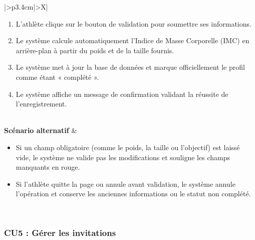 ﻿\documentclass[a4paper,12pt]{report}
\begin{document}
\begin{table}[H]
\begin{tabularx}{\textwidth}{|>{\RaggedRight\arraybackslash}p{3.4cm}|>{\RaggedRight\arraybackslash}X|}
\begin{minipage}[t]{\linewidth}
\begin{enumerate}[label=\arabic*., leftmargin=*, topsep=0pt, itemsep=1pt]
    \begin{itemize}[leftmargin=*, topsep=1pt, itemsep=1pt]
        \item \textbf{Première configuration} : le système affiche un questionnaire vide. L'athlète remplit ses informations obligatoires (âge, taille, poids, objectif principal, etc.). 
        \item \textbf{Mise à jour} : le système affiche le formulaire pré-rempli avec les anciennes données. L'athlète modifie uniquement les informations souhaitées. 
    \end{itemize}
    \item L'athlète clique sur le bouton de validation pour soumettre ses informations.
    \item Le système calcule automatiquement l'Indice de Masse Corporelle (IMC) en arrière-plan à partir du poids et de la taille fournis.
    \item Le système met à jour la base de données et marque officiellement le profil comme étant « complété ».
    \item Le système affiche un message de confirmation validant la réussite de l'enregistrement.
\end{enumerate}
\vspace{2pt}
\end{minipage} \\
\hline
\textbf{Scénario alternatif} &
\begin{minipage}[t]{\linewidth}
\vspace{2pt}
\begin{itemize}[leftmargin=*, topsep=0pt, itemsep=1pt]
    \item Si un champ obligatoire (comme le poids, la taille ou l'objectif) est laissé vide, le système ne valide pas les modifications et souligne les champs manquants en rouge.
    \item  Si l'athlète quitte la page ou annule avant validation, le système annule l'opération et conserve les anciennes informations ou le statut non complété.
\end{itemize}
\vspace{2pt}
\end{minipage} \\
\hline
\end{tabularx}
\end{table}

\subsubsection*{CU5 : Gérer les invitations}
\end{document}
